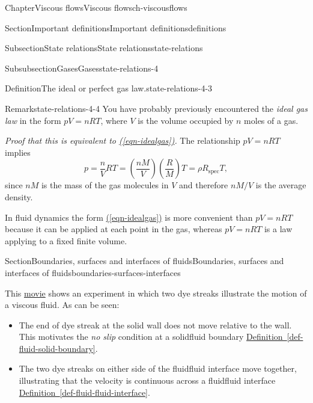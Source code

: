 \documentclass[oneside,10pt,]{book}
\newcommand{\xreffont}{\relax}
\newcommand{\ptxlistdisc}{\raisebox{0.3ex}{\textbullet}}
\numberwithin{equation}{section}
\begin{document}
\begin{chapterptx}{Chapter}{Viscous flows}{}{Viscous flows}{}{}{ch-viscousflows}
\begin{sectionptx}{Section}{Important definitions}{}{Important definitions}{}{}{definitions}
\begin{subsectionptx}{Subsection}{State relations}{}{State relations}{}{}{state-relations}
\begin{subsubsectionptx}{Subsubsection}{Gases}{}{Gases}{}{}{state-relations-4}
\begin{definition}{Definition}{The ideal or perfect gas law.}{}{state-relations-4-3}
%
\end{definition}
\begin{remark}{Remark}{}{state-relations-4-4}%
You have probably previously encountered the \emph{ideal gas law} in the form \(pV=nRT\), where \(V\) is the volume occupied by \(n\) moles of a gas.%
\par
\emph{Proof that this is equivalent to \hyperref[eqn-idealgas]{({\xreffont\ref{eqn-idealgas}})}.} The relationship \(pV=nRT\) implies%
\begin{equation*}
p=\frac{n}{V}RT=\left(\frac{nM}{V}\right)\left(\frac{R}{M}\right)T
=\rho R_{\textrm{spec}} T,
\end{equation*}
since \(nM\) is the mass of the gas molecules in \(V\) and therefore \(nM/V\) is the average density.%
\par
In fluid dynamics the form \hyperref[eqn-idealgas]{({\xreffont\ref{eqn-idealgas}})} is more convenient than \(pV=nRT\) because it can be applied at each point in the gas, whereas \(pV=nRT\) is a law applying to a fixed finite volume.%
\end{remark}
\end{subsubsectionptx}
\end{subsectionptx}
\end{sectionptx}
%
%
\typeout{************************************************}
\typeout{************************************************}
%
\begin{sectionptx}{Section}{Boundaries, surfaces and interfaces of fluids}{}{Boundaries, surfaces and interfaces of fluids}{}{}{boundaries-surfaces-interfaces}
\begin{introduction}{}%
This \href{https://www-cambridge-org.ezproxy1.bath.ac.uk/core/homsy/category/118}{movie} shows an experiment in which two dye streaks illustrate the motion of a viscous fluid. As can be seen:%
\begin{itemize}[label=\ptxlistdisc]
\item{}The end of dye streak at the solid wall does not move relative to the wall. This motivates the \emph{no slip} condition at a solid\textendash{}fluid boundary \hyperref[def-fluid-solid-boundary]{Definition~{\xreffont\ref{def-fluid-solid-boundary}}}.%
\item{}The two dye streaks on either side of the fluid\textendash{}fluid interface move together, illustrating that the velocity is continuous across a fluid\textendash{}fluid interface \hyperref[def-fluid-fluid-interface]{Definition~{\xreffont\ref{def-fluid-fluid-interface}}}.%

\end{itemize}
\end{introduction}
\end{sectionptx}
\end{chapterptx}
\end{document}
